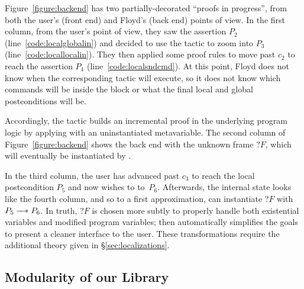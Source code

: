 Figure~\ref{figure:backend} has two partially-decorated ``proofs in progress'', from both the user's (front end) and Floyd's (back end) points of view.  In the first column, from the user's point of view, they saw the assertion $P_2$ (line~\ref{code:localglobalin}) and decided to use the  tactic to zoom into $P_3$ (line~\ref{code:locallocalin}).  They then applied some proof rules to move past $c_2$ to reach the assertion $P_4$ (line~\ref{code:localsndcmd}).  At this point, Floyd does not know when the corresponding  tactic will execute, so it does not know which commands will be inside the block or what the final local and global postconditions will be.

Accordingly, the  tactic builds an incremental proof in the underlying program logic by applying  with an uninstantiated metavariable.
The second column of Figure~\ref{figure:backend} shows the back end with the unknown frame $?F$, which will eventually be instantiated by .

In the third column, the user has advanced past $c_3$ to reach the local postcondition $P_5$ and now wishes to  to~$P_6$.  Afterwards, the internal state looks like the fourth column, and so to a first approximation,  can instantiate $?F$ with $P_5 \mathrel{\mbox{$\hspace*{-0.03em}\mathord{-}\hspace*{-0.4em} \mathord{-}\hspace*{-0.13em} \mathord{\mathbin{\ast}}$\hspace*{-0.005em}}} P_6$.  In truth, $?F$ is chosen more subtly to properly handle both existential variables and modified program variables;  then automatically simplifies the goals to present a cleaner interface to the user.  These transformations require the additional theory given in \S\ref{sec:localizations}.

\subsection{Modularity of our Library}
\label{sec:modularlibrary}

